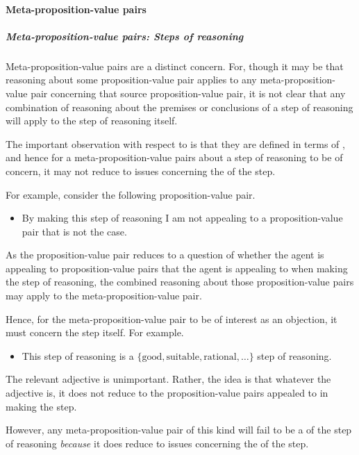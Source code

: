 \hozline

\paragraph{Meta-proposition-value pairs}

\subparagraph*{Meta-proposition-value pairs: Steps of reasoning}

\begin{note}
  Meta-proposition-value pairs are a distinct concern.
  For, though it may be that reasoning about some proposition-value pair applies to any meta-proposition-value pair concerning that source proposition-value pair, it is not clear that any combination of reasoning about the premises or conclusions of a step of reasoning will apply to the step of reasoning itself.
\end{note}

\begin{note}
  The important observation with respect to  is that they are defined in terms of , and hence for a meta-proposition-value pairs about a step of reasoning to be of concern, it may not reduce to issues concerning the  of the step.

  For example, consider the following proposition-value pair.
  \begin{itemize}
  \item By making this step of reasoning I am not appealing to a proposition-value pair that is not the case.
  \end{itemize}
  As the proposition-value pair reduces to a question of whether the agent is appealing to proposition-value pairs that the agent is appealing to when making the step of reasoning, the combined reasoning about those proposition-value pairs may apply to the meta-proposition-value pair.
\end{note}

\begin{note}
  Hence, for the meta-proposition-value pair to be of interest as an objection, it must concern the step itself.
  For example.
  \begin{itemize}
  \item This step of reasoning is a \(\{\text{good},\text{suitable},\text{rational},\dots\}\) step of reasoning.
  \end{itemize}
  The relevant adjective is unimportant.
  Rather, the idea is that whatever the adjective is, it does not reduce to the proposition-value pairs appealed to in making the step.

  However, any meta-proposition-value pair of this kind will fail to be a  of the step of reasoning \emph{because} it does reduce to issues concerning the  of the step.
\end{note}

